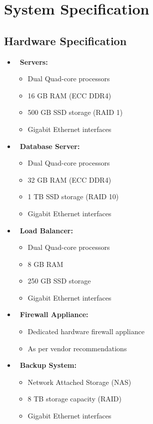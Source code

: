 \documentclass[10pt]{report}
\begin{document}
\section{System Specification}
\subsection{Hardware Specification}

{
\begin{itemize}[label=--]
  \item \textbf{\ Servers:}
  \
  \begin{itemize}
      \item Dual Quad-core processors
      \item 16 GB RAM (ECC DDR4)
      \item 500 GB SSD storage (RAID 1)
      \item Gigabit Ethernet interfaces
  \end{itemize}
  
  \item \textbf{\ Database Server:}
  \begin{itemize}
      \item Dual Quad-core processors
      \item 32 GB RAM (ECC DDR4)
      \item 1 TB SSD storage (RAID 10)
      \item Gigabit Ethernet interfaces
  \end{itemize}
  
  \item \textbf{\ Load Balancer:}
  \begin{itemize}
      \item Dual Quad-core processors
      \item 8 GB RAM
      \item 250 GB SSD storage
      \item Gigabit Ethernet interfaces
  \end{itemize}
  
  \item \textbf{\ Firewall Appliance:}
  \begin{itemize}
      \item Dedicated hardware firewall appliance
      \item As per vendor recommendations
  \end{itemize}
  
  \item \textbf{\ Backup System:}
  \begin{itemize}
      \item Network Attached Storage (NAS)
      \item 8 TB storage capacity (RAID)
      \item Gigabit Ethernet interfaces
  \end{itemize}
  

\end{itemize}}
\end{document}
